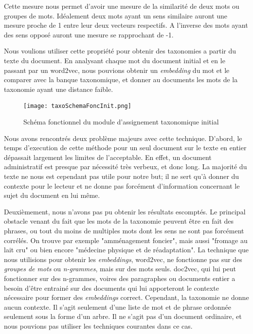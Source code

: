 Cette mesure nous permet d'avoir une mesure de la similarité de deux mots ou groupes de mots.
Idéalement deux mots ayant un sens similaire auront une mesure proche de 1 entre leur deux vecteurs respectifs.
A l'inverse des mots ayant des sens opposé auront une mesure se rapprochant de -1. 

Nous voulions utiliser cette propriété pour obtenir des taxonomies a partir du texte du document.
En analysant chaque mot du document initial et en le passant par un word2vec, nous pouvions obtenir un \textit{embedding} du mot et le comparer avec la banque taxonomique, et donner au documents les mots de la taxonomie ayant une distance faible. 

\begin{figure}[h!]
  \centering
  \texttt{[image: taxoSchemaFoncInit.png]}
	\caption[]{Schéma fonctionnel du module d'assignement taxonomique initial}
  \label{taxoInit}
\end{figure}


Nous avons rencontrés deux problème majeurs avec cette technique.
D'abord, le temps d'execution de cette méthode pour un seul document sur le texte en entier dépassait largement les limites de l'acceptable.
En effet, un document administratif est presque par nécessité très verbeux, et donc long. La majorité du texte ne nous est cependant pas utile pour notre but; 
il ne sert qu'à donner du contexte pour le lecteur et ne donne pas forcément d'information concernant le sujet du document en lui même. 

Deuxièmement, nous n'avons pas pu obtenir les résultats escomptés.
Le principal obstacle venant du fait que les mots de la taxonomie peuvent être en fait des phrases, ou tout du moins de multiples mots dont les sens ne sont pas forcément corrélés.
On trouve par exemple "amménagement foncier", mais aussi "fromage au lait cru" ou bien encore "médecine physique et de réadaptation".
La technique que nous utilisions pour obtenir les \textit{embeddings}, word2vec, ne fonctionne pas sur des \textit{groupes de mots} ou \textit{n-grammes}, mais sur des mots seuls.
doc2vec, qui lui peut fonctionner sur des n-grammes, voires des paragraphes ou documents entier a besoin d'être entrainé sur des documents qui lui apporteront le contexte nécessaire pour former des \textit{embeddings} correct.
Cependant, la taxonomie ne donne aucun contexte.
Il s'agit seulement d'une liste de mot et de phrase ordonnée seulement sous la forme d'un arbre.
Il ne s'agit pas d'un document ordinaire, et nous pouvions pas utiliser les techniques courantes dans ce cas. 

